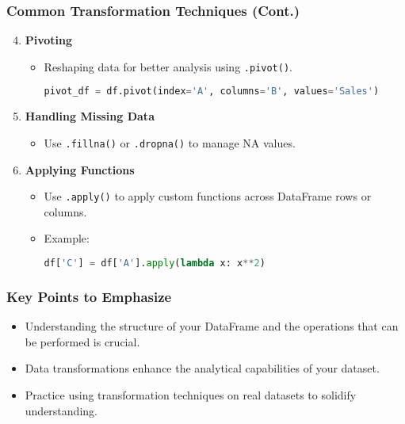 \documentclass[aspectratio=169]{beamer}
\begin{document}
\begin{frame}[fragile]
    \frametitle{Common Transformation Techniques (Cont.)}
    \begin{enumerate}
        \setcounter{enumi}{3} %
        \item \textbf{Pivoting}
        \begin{itemize}
            \item Reshaping data for better analysis using \texttt{.pivot()}.
            \begin{lstlisting}[language=Python]
pivot_df = df.pivot(index='A', columns='B', values='Sales')
            \end{lstlisting}
        \end{itemize}

        \item \textbf{Handling Missing Data}
        \begin{itemize}
            \item Use \texttt{.fillna()} or \texttt{.dropna()} to manage NA values.
        \end{itemize}

        \item \textbf{Applying Functions}
        \begin{itemize}
            \item Use \texttt{.apply()} to apply custom functions across DataFrame rows or columns.
            \item Example:
            \begin{lstlisting}[language=Python]
df['C'] = df['A'].apply(lambda x: x**2)
            \end{lstlisting}
        \end{itemize}
    \end{enumerate}
\end{frame}

\begin{frame}
    \frametitle{Key Points to Emphasize}
    \begin{itemize}
        \item Understanding the structure of your DataFrame and the operations that can be performed is crucial.
        \item Data transformations enhance the analytical capabilities of your dataset.
        \item Practice using transformation techniques on real datasets to solidify understanding.
    \end{itemize}
\end{frame}
\end{document}
